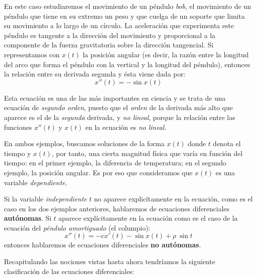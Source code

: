 \begin{example}[Péndulo]
En este caso estudiaremos el movimiento de un péndulo \emph{bob}, el movimiento de un péndulo que tiene en su extremo un peso y que cuelga de un soporte que limita su movimiento a lo largo de un círculo. La aceleración que experimenta este péndulo es tangente a la dirección del movimiento y proporcional a la componente de la fuerza gravitatoria sobre la dirección tangencial. Si representamos con $x(t)$ la posición angular (es decir, la razón entre la longitud del arco que forma el péndulo con la vertical y la longitud del péndulo), entonces la relación entre su derivada segunda y ésta viene dada por:
\begin{equation}
x''(t) = -\sin x(t)
\end{equation}

Esta ecuación es una de las más importantes en ciencia y se trata de una ecuación de \emph{segundo orden}, puesto que el \emph{orden} de la derivada más alto que aparece es el de la \emph{segunda} derivada, y \emph \emph{no lineal}, porque la relación entre las funciones $x''(t)$ y $x(t)$ en la ecuación es \emph{no lineal}.
\end{example}


En ambos ejemplos, buscamos soluciones de la forma $x(t)$ donde $t$ denota el tiempo y $x(t)$, por tanto, una cierta magnitud física que varía en función del tiempo: en el primer ejemplo, la diferencia de temperatura; en el segundo ejemplo, la posición angular. Es por eso que consideramos que $x(t)$ es una variable \emph{dependiente}.


\begin{definition}
Si la variable \emph{independiente} $t$ no aparece explicítamente en la ecuación, como es el caso en los dos ejemplos anteriores, hablaremos de ecuaciones diferenciales \textbf{autónomas}. Si $t$ aparece explícitamente en la ecuación como es el caso de la ecuación del \emph{péndulo amortiguado} (el columpio):
\begin{equation}
x''(t) = -cx'(t)-\sin x(t)+\rho~\sin t
\end{equation}
entonces hablaremos de ecuaciones diferenciales \textbf{no autónomas}.
\end{definition}

Recapitulando las nociones vistas hasta ahora tendríamos la siguiente clasificación de las ecuaciones diferenciales:

